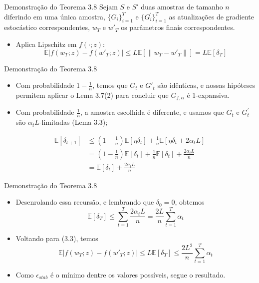 \documentclass{beamer}
\newcommand{\EE}{\mathbb{E}}
\begin{document}
\begin{frame}{Demonstração do Teorema 3.8} 
Sejam $S$ e \(S'\) duas amostras de tamanho $n$ diferindo em uma única amostra, $\{G_i\}_{i=1}^{T}$ e $\{G_i^\prime\}_{i=1}^{T}$ as atualizações de gradiente estocástico correspondentes, $w_T$ e $w'_T$ os parâmetros finais correspondentes.



\begin{itemize}
    \item Aplica Lipschitz em \(f(\cdot;z)\):
    \begin{equation*}        \tag{3.3}
        \EE|f(w_{T};z) - f(w'_{T};z)| \le L\EE[\|w_{T} - w'_{T}\|] = L\EE[\delta_{T}]
    \end{equation*}
\end{itemize}

\end{frame}
\begin{frame}{Demonstração do Teorema 3.8}
    
\begin{itemize} 
    \item Com probabilidade $1-\frac{1}{n}$, temos que $G_t$ e $G'_t$ são idênticas, e nossas hipóteses permitem aplicar o Lema 3.7(2) para concluir que \(G_{f,\alpha}\) é 1-expansiva.
    \item Com probabilidade $\frac{1}{n}$, a amostra escolhida é diferente, e usamos que $G_t$ e $G_t^\prime$ são $\alpha_tL$-limitadas (Lema 3.3);
\end{itemize}
\begin{align*}\tag{3.4}
    \EE[\delta_{t+1}] &\le \left(1-\frac{1}{n}\right)\EE[\eta\delta_{t}] + \frac{1}{n}\EE[\eta\delta_{t} + 2\alpha_t L] \\
    &= \left(1-\frac{1}{n}\right)\EE[\delta_{t}] + \frac{1}{n}\EE[\delta_{t}] + \frac{2\alpha_t L}{n} \\
    &= \EE[\delta_{t}] + \frac{2\alpha_t L}{n}
\end{align*}
\end{frame}

\begin{frame}{Demonstração do Teorema 3.8}
    \begin{itemize}
        \item Desenrolando essa recursão, e lembrando que $\delta_0=0$, obtemos
$$ \EE[\delta_{T}] \le \sum_{t=1}^{T} \frac{2\alpha_t L}{n} = \frac{2L}{n}\sum_{t=1}^{T}\alpha_t $$
\item Voltando para (3.3), temos
 $$ \EE|f(w_{T};z) - f(w'_{T};z)| \le L\EE[\delta_{T}] \le \frac{2L^2}{n}\sum_{t=1}^{T}\alpha_{t} $$
 \item Como $\epsilon_{stab} $ é o mínimo dentre os valores possíveis, segue o resultado.
    \end{itemize}
\end{frame}
\end{document}
